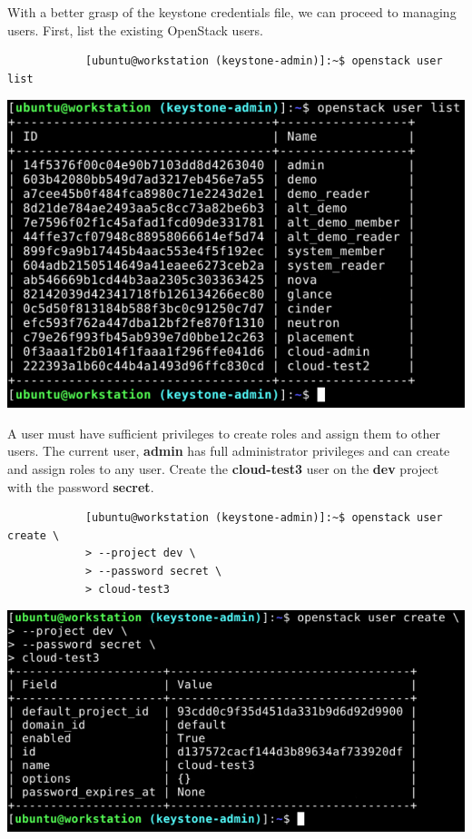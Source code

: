 \documentclass[letterpaper, 12pt]{article}
\begin{document}
\begin{enumerate}
    \begin{labstep}
        With a better grasp of the keystone credentials file, we can proceed to managing users.
        First, list the existing OpenStack users.
        \begin{lstlisting}
            [ubuntu@workstation (keystone-admin)]:~$ openstack user list
        \end{lstlisting}

        \begin{center}
            \includegraphics[width=\linewidth]{images/part4/step5.png}
        \end{center}
    \end{labstep}

    \begin{labstep}
        A user must have sufficient privileges to create roles and assign them to other users.
        The current user, \textbf{admin} has full administrator privileges and can create and assign roles to any user.
        Create the \textbf{cloud-test3} user on the \textbf{dev} project with the password \textbf{secret}.
        \begin{lstlisting}
            [ubuntu@workstation (keystone-admin)]:~$ openstack user create \
            > --project dev \
            > --password secret \
            > cloud-test3
        \end{lstlisting}

        \begin{center}
            \includegraphics[width=\linewidth]{images/part4/step6.png}
        \end{center}
    \end{labstep}


\end{enumerate}
\end{document}
